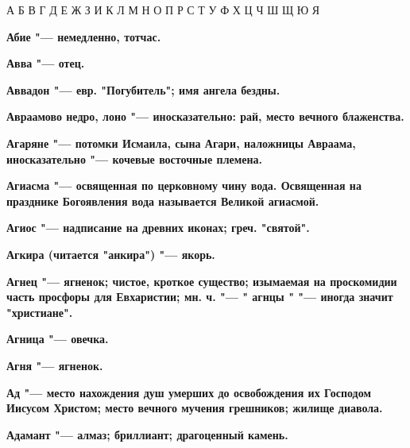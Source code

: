 

 



А
Б
В
Г
Д
Е
Ж
З
И
К
Л
М
Н
О
П
Р
С
Т
У
Ф
Х
Ц
Ч
Ш
Щ
Ю
Я





\bfseries Абие \normalfont{} "--- немедленно, тотчас. 




\bfseries Авва \normalfont{} "--- отец. 




\bfseries Аввадон \normalfont{} "--- евр. "Погубитель"; имя ангела бездны. 




\bfseries Авраамово недро, лоно \normalfont{} "--- иносказательно: рай, место вечного блаженства. 




\bfseries Агаряне \normalfont{} "--- потомки Исмаила, сына Агари, наложницы Авраама, иносказательно "--- кочевые восточные племена. 




\bfseries Агиасма \normalfont{} "--- освященная по церковному чину вода. Освященная на празднике Богоявления вода называется Великой агиасмой. 




\bfseries Агиос \normalfont{} "--- надписание на древних иконах; греч. "святой". 




\bfseries Агкира \normalfont{} (читается "анкира") "--- якорь. 




\bfseries Агнец \normalfont{} "--- ягненок; чистое, кроткое существо; изымаемая на проскомидии часть просфоры для Евхаристии; мн. ч. "--- " \bfseries агнцы \normalfont{}" "--- иногда значит "христиане". 




\bfseries Агница \normalfont{} "--- овечка. 




\bfseries Агня \normalfont{} "--- ягненок. 




\bfseries Ад \normalfont{} "--- место нахождения душ умерших до освобождения их Господом Иисусом Христом; место вечного мучения грешников; жилище диавола. 




\bfseries Адамант \normalfont{} "--- алмаз; бриллиант; драгоценный камень. 




